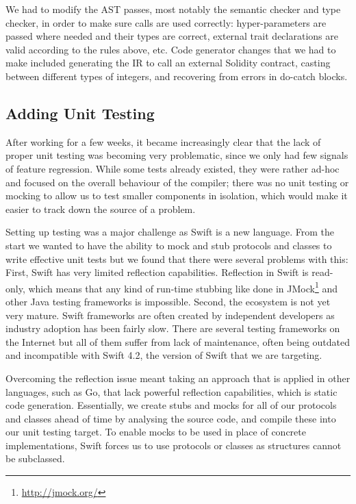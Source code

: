 We had to modify the AST passes, most notably the semantic checker and type checker, in order to make sure calls are used correctly: hyper-parameters are passed where needed and their types are correct, external trait declarations are valid according to the rules above, etc. Code generator changes that we had to make included generating the IR to call an external Solidity contract, casting between different types of integers, and recovering from errors in do-catch blocks.

\subsection{Adding Unit Testing}

After working for a few weeks, it became increasingly clear that the lack of proper unit testing was becoming very problematic, since we only had few signals of feature regression. While some tests already existed, they were rather ad-hoc and focused on the overall behaviour of the compiler; there was no unit testing or mocking to allow us to test smaller components in isolation, which would make it easier to track down the source of a problem.

Setting up testing was a major challenge as Swift is a new language. From the start we wanted to have the ability to mock and stub protocols and classes to write effective unit tests but we found that there were several problems with this: First, Swift has very limited reflection capabilities. Reflection in Swift is read-only, which means that any kind of run-time stubbing like done in JMock\footnote{\url{http://jmock.org/}} and other Java testing frameworks is impossible. Second, the ecosystem is not yet very mature. Swift frameworks are often created by independent developers as industry adoption has been fairly slow. There are several testing frameworks on the Internet but all of them suffer from lack of maintenance, often being outdated and incompatible with Swift 4.2, the version of Swift that we are targeting.

Overcoming the reflection issue meant taking an approach that is applied in other languages, such as Go, that lack powerful reflection capabilities, which is static code generation. Essentially, we create stubs and mocks for all of our protocols and classes ahead of time by analysing the source code, and compile these into our unit testing target. To enable mocks to be used in place of concrete implementations, Swift forces us to use protocols or classes as structures cannot be subclassed.


